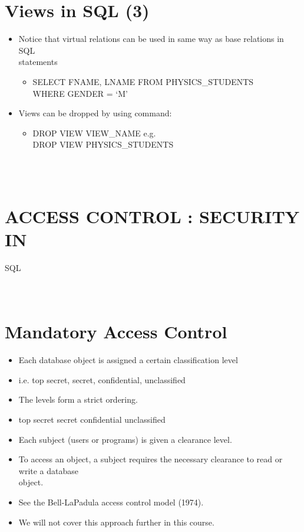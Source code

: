 \documentclass[12pt]{article}
\begin{document}
\section{Views in SQL (3)}
\begin{itemize}
  \item Notice that virtual relations can be used in 
same way as base relations in SQL \\
statements\\
\begin{itemize}
  \item SELECT FNAME, LNAME
FROM PHYSICS\_STUDENTS\\
WHERE GENDER = ‘M’\\
\end{itemize}
  \item Views can be dropped by using command:
\begin{itemize}
  \item DROP VIEW \<VIEW\_NAME\>
e.g.\\
DROP VIEW PHYSICS\_STUDENTS\\
\end{itemize}
\end{itemize}
\\ 
 \\
\section{ACCESS CONTROL : SECURITY IN }
SQL\\
\\ 
 \\
\section{Mandatory Access Control}
\begin{itemize}
  \item Each database object is assigned a certain 
classification level\\
  \item i.e. top secret, secret, confidential, unclassified
  \item The levels form a strict ordering.
  \item top secret \> secret \> confidential\> unclassified
  \item Each subject (users or programs) is given a 
clearance level.\\
  \item To access an object, a subject requires the 
necessary clearance to read or write a database \\
object.\\
  \item See the Bell-LaPadula access control model (1974).
  \item We will not cover this approach further in this 
course.\\
\end{itemize}
\\ 
 \\
\end{document}
